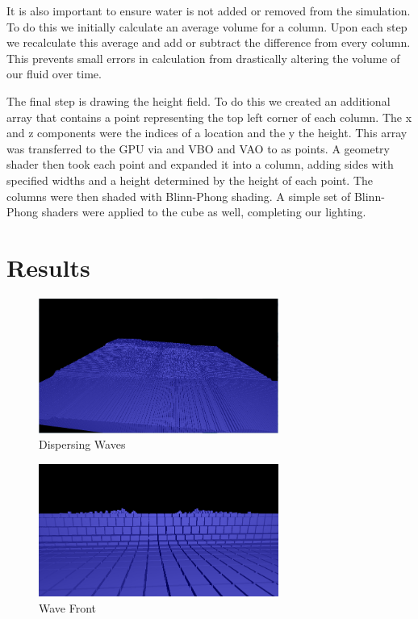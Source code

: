 \documentclass[12pt,titlepage]{article}
\begin{document}
It is also important to ensure water is not added or removed from the simulation.  To do this we initially calculate an average volume for a column.  Upon each step we recalculate this average and add or subtract the difference from every column.  This prevents small errors in calculation from drastically altering the volume of our fluid over time.

The final step is drawing the height field.  To do this we created an additional array that contains a point representing the top left corner of each column.  The x and z components were the indices of a location and the y the height.  This array was transferred to the GPU via and VBO and VAO to as points.  A geometry shader then took each point and expanded it into a column, adding sides with specified widths and a height determined by the height of each point.  The columns were then shaded with Blinn-Phong shading.  A simple set of Blinn-Phong shaders were applied to the cube as well, completing our lighting.

\section{Results}

\begin{figure}[H]
    \caption{Dispersing Waves}
    \label{fig:waves}
    \centering
    \includegraphics[width=0.7\textwidth]{../www/images/waterWaves}
\end{figure}

\begin{figure}[H]
    \caption{Wave Front}
    \label{fig:front}
    \centering
    \includegraphics[width=0.7\textwidth]{../www/images/waveFront}
\end{figure}
\end{document}
